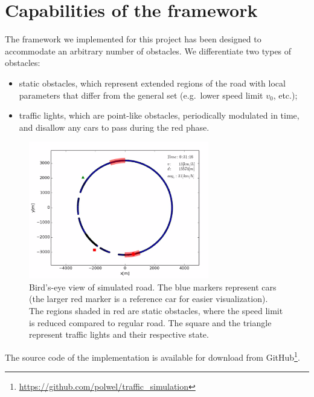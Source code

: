 \appendix 
{}
\section{Capabilities of the framework}
The framework we implemented for this project has been designed to accommodate an arbitrary number of obstacles. We differentiate two types of obstacles:

\begin{itemize}
    \item static obstacles, which represent extended regions of the road with local parameters that differ from the general set (e.g.\ lower speed limit $v_0$, etc.);
    \item traffic lights, which are point-like obstacles, periodically modulated in time, and disallow any cars to pass during the red phase.
\end{itemize}

\begin{figure}[h!]
    \centering
    \includegraphics[width=0.7\textwidth]{../img/traffic_light.png}
    \caption{Bird's-eye view of simulated road. The blue markers represent cars (the larger red marker is a reference car for easier visualization). The regions shaded in red are static obstacles, where the speed limit is reduced compared to regular road. The square and the triangle represent traffic lights and their respective state.}
\end{figure}

The source code of the implementation is available for download from GitHub\footnote{ \url{https://github.com/polwel/traffic_simulation}}.

